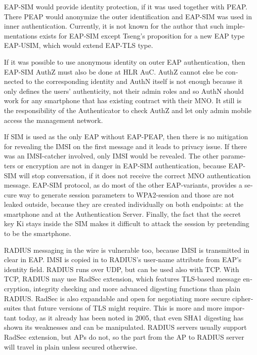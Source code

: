 \documentclass[12pt,a4paper,english]{tutthesis}
\begin{document}
\begin{otherlanguage}{english}
EAP-SIM would provide identity protection, if it was used together
with PEAP. There PEAP would anonymize the outer identification  and
EAP-SIM was used in inner authentication.
Currently, it is not known for the author that such implementations exists for
EAP-SIM  except Tseng's proposition\cite{tseng-usim} for a new EAP type
EAP-USIM, which would extend EAP-TLS type.

If it was possible to use anonymous identity on outer EAP
authentication, then EAP-SIM AuthZ must also be done at HLR AuC.
AuthZ cannot else be connected to the corresponding
identity and AuthN itself is not enough because it only defines the users'
authenticity, not their admin roles and so 
AuthN should work for any  smartphone that has existing contract with
their MNO. 
It still is the responsibility of the Authenticator to 
check AuthZ  and let only admin mobile access the management network.

If SIM is used as the only EAP without EAP-PEAP, then there is no
mitigation for revealing the IMSI on the first message and it leads to
privacy issue.  If there was an IMSI-catcher involved, only IMSI would
be revealed.  The other parameters or encryption are not in danger in
EAP-SIM authentication, because EAP-SIM will stop conversation, if it
does not receive the correct MNO authentication message.  EAP-SIM
protocol, as do most of the other EAP-variants, provides a secure way
to generate session parameters to WPA2-session and those are not
leaked outside, because they are created individually on both
endpoints: at the smartphone and at the Authentication Server.
Finally, the fact that the secret key Ki stays inside the SIM makes it
difficult to attack the session by pretending to be the smartphone.






RADIUS messaging in the wire is vulnerable too, because IMSI is transmitted in clear 
in EAP. IMSI is copied in to RADIUS's user-name attribute from EAP's identity field.
RADIUS runs over UDP, but can be used also with TCP. With TCP, RADIUS
may use RadSec extension, which features TLS-based message encryption,
integrity checking and more advanced digesting functions than plain
RADIUS.
RadSec is also expandable and open 
for negotiating more secure ciphersuites that future 
versions of TLS might require\cite{rfc6614}. This is
more and more important today, as it already has been noted in 2005,
that even SHA1 digesting has shown its weaknesses and can be manipulated.
RADIUS servers usually support RadSec extension, but APs do not, so 
the part from the AP to RADIUS server will travel in plain unless
secured otherwise.



\end{otherlanguage}
\end{document}
